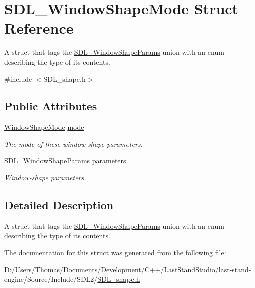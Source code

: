 \hypertarget{structSDL__WindowShapeMode}{}\section{S\+D\+L\+\_\+\+Window\+Shape\+Mode Struct Reference}
\label{structSDL__WindowShapeMode}


A struct that tags the \hyperlink{unionSDL__WindowShapeParams}{S\+D\+L\+\_\+\+Window\+Shape\+Params} union with an enum describing the type of its contents.  




{\ttfamily \#include $<$S\+D\+L\+\_\+shape.\+h$>$}

\subsection*{Public Attributes}
\begin{DoxyCompactItemize}
\item 
\hypertarget{structSDL__WindowShapeMode_a40ebd8b9a76d982cbd87563386cc05de}{}\hyperlink{SDL__shape_8h_aa30948f2699e316a43b740eccebe5c20}{Window\+Shape\+Mode} \hyperlink{structSDL__WindowShapeMode_a40ebd8b9a76d982cbd87563386cc05de}{mode}\label{structSDL__WindowShapeMode_a40ebd8b9a76d982cbd87563386cc05de}

\begin{DoxyCompactList}\small\item\em The mode of these window-\/shape parameters. \end{DoxyCompactList}\item 
\hypertarget{structSDL__WindowShapeMode_a2f79bb294034156207fa6d88d3a8c819}{}\hyperlink{unionSDL__WindowShapeParams}{S\+D\+L\+\_\+\+Window\+Shape\+Params} \hyperlink{structSDL__WindowShapeMode_a2f79bb294034156207fa6d88d3a8c819}{parameters}\label{structSDL__WindowShapeMode_a2f79bb294034156207fa6d88d3a8c819}

\begin{DoxyCompactList}\small\item\em Window-\/shape parameters. \end{DoxyCompactList}\end{DoxyCompactItemize}


\subsection{Detailed Description}
A struct that tags the \hyperlink{unionSDL__WindowShapeParams}{S\+D\+L\+\_\+\+Window\+Shape\+Params} union with an enum describing the type of its contents. 

The documentation for this struct was generated from the following file\+:\begin{DoxyCompactItemize}
\item 
D\+:/\+Users/\+Thomas/\+Documents/\+Development/\+C++/\+Last\+Stand\+Studio/last-\/stand-\/engine/\+Source/\+Include/\+S\+D\+L2/\hyperlink{SDL__shape_8h}{S\+D\+L\+\_\+shape.\+h}\end{DoxyCompactItemize}
